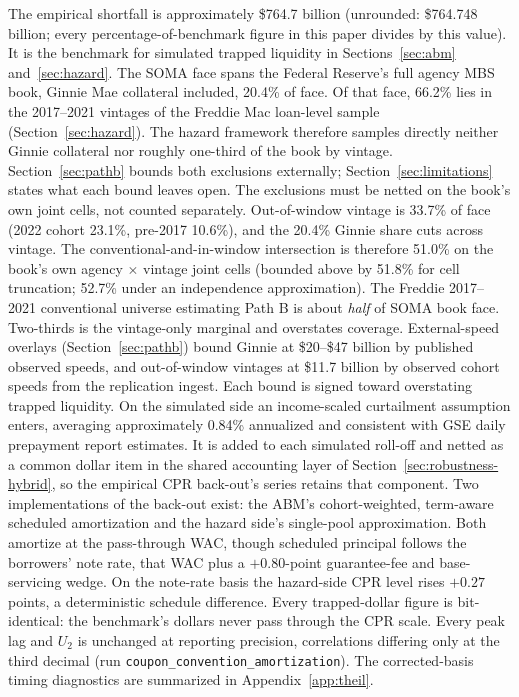 \documentclass[12pt]{article}
\begin{document}
The empirical shortfall is approximately \$764.7 billion (unrounded: \$764.748 billion; every percentage-of-benchmark figure in this paper divides by this value). It is the benchmark for simulated trapped liquidity in Sections~\ref{sec:abm} and~\ref{sec:hazard}. The SOMA face spans the Federal Reserve's full agency MBS book, Ginnie Mae collateral included, 20.4\% of face. Of that face, 66.2\% lies in the 2017--2021 vintages of the Freddie Mac loan-level sample (Section~\ref{sec:hazard}). The hazard framework therefore samples directly neither Ginnie collateral nor roughly one-third of the book by vintage. Section~\ref{sec:pathb} bounds both exclusions externally; Section~\ref{sec:limitations} states what each bound leaves open. The exclusions must be netted on the book's own joint cells, not counted separately. Out-of-window vintage is 33.7\% of face (2022 cohort 23.1\%, pre-2017 10.6\%), and the 20.4\% Ginnie share cuts across vintage. The conventional-and-in-window intersection is therefore 51.0\% on the book's own agency $\times$ vintage joint cells (bounded above by 51.8\% for cell truncation; 52.7\% under an independence approximation). The Freddie 2017--2021 conventional universe estimating Path B is about \emph{half} of SOMA book face. Two-thirds is the vintage-only marginal and overstates coverage. External-speed overlays (Section~\ref{sec:pathb}) bound Ginnie at \$20--\$47 billion by published observed speeds, and out-of-window vintages at \$11.7 billion by observed cohort speeds from the replication ingest. Each bound is signed toward overstating trapped liquidity. On the simulated side an income-scaled curtailment assumption enters, averaging approximately 0.84\% annualized and consistent with GSE daily prepayment report estimates. It is added to each simulated roll-off and netted as a common dollar item in the shared accounting layer of Section~\ref{sec:robustness-hybrid}, so the empirical CPR back-out's series retains that component. Two implementations of the back-out exist: the ABM's cohort-weighted, term-aware scheduled amortization and the hazard side's single-pool approximation. Both amortize at the pass-through WAC, though scheduled principal follows the borrowers' note rate, that WAC plus a $+0.80$-point guarantee-fee and base-servicing wedge. On the note-rate basis the hazard-side CPR level rises $+0.27$ points, a deterministic schedule difference. Every trapped-dollar figure is bit-identical: the benchmark's dollars never pass through the CPR scale. Every peak lag and $U_2$ is unchanged at reporting precision, correlations differing only at the third decimal (run \texttt{coupon\_convention\_amortization}). The corrected-basis timing diagnostics are summarized in Appendix~\ref{app:theil}.
\end{document}
